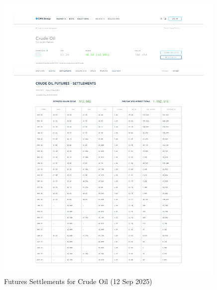\documentclass[11pt,a4paper]{article} %
\begin{document}
\begin{figure}[h]
  \centering
  \includegraphics[width=0.99\textwidth]{appendix/CRUDEOIL12SEP.pdf}
  \caption{Futures Settlements for Crude Oil (12 Sep 2025)}
  \label{fig:crudeoil_settlements}
\end{figure}
\end{document}
